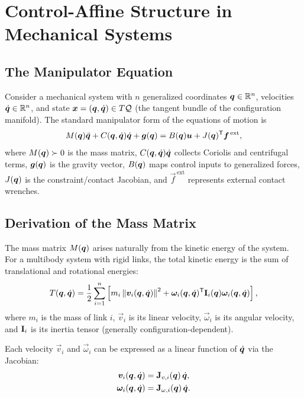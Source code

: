 \section{Control-Affine Structure in Mechanical Systems}

\subsection{The Manipulator Equation}

Consider a mechanical system with $n$ generalized coordinates $\bm{q}\in\mathbb{R}^n$, velocities
$\dot{\bm{q}}\in\mathbb{R}^n$, and state $\bm{x} = (\bm{q}, \dot{\bm{q}}) \in T\mathcal{Q}$ (the tangent bundle of
the configuration manifold). The standard manipulator form of the equations of motion is
\begin{equation}
M(\bm{q})\ddot{\bm{q}} + C(\bm{q},\dot{\bm{q}})\dot{\bm{q}} + \bm{g}(\bm{q}) = B(\bm{q})\bm{u} + J(\bm{q})^{\mathsf{T}}\bm{f}^{\,\text{ext}},
\label{eq:ch3:manipulator}
\end{equation}
where $M(\bm{q})\succ 0$ is the mass matrix, $C(\bm{q},\dot{\bm{q}})\dot{\bm{q}}$ collects Coriolis and
centrifugal terms, $\bm{g}(\bm{q})$ is the gravity vector, $B(\bm{q})$ maps control inputs to
generalized forces, $J(\bm{q})$ is the constraint/contact Jacobian, and
$\vec{f}^{\,\text{ext}}$ represents external contact wrenches.

\subsection{Derivation of the Mass Matrix}

The mass matrix $M(\bm{q})$ arises naturally from the kinetic energy of the system. For a
multibody system with rigid links, the total kinetic energy is the sum of translational
and rotational energies:
\begin{equation}
T(\bm{q},\dot{\bm{q}}) = \frac{1}{2}\sum_{i=1}^n \left[ m_i \left\lVert \bm{v}_i(\bm{q},\dot{\bm{q}}) \right\rVert^2
+ \bm{\omega}_i(\bm{q},\dot{\bm{q}})^{\mathsf{T}} \mathbf{I}_i(\bm{q}) \bm{\omega}_i(\bm{q},\dot{\bm{q}}) \right],
\label{eq:ch3:kinetic-energy}
\end{equation}
where $m_i$ is the mass of link $i$, $\vec{v}_i$ is its linear velocity, $\vec\omega_i$ is its
angular velocity, and $\mathbf{I}_i$ is its inertia tensor (generally configuration-dependent).

Each velocity $\vec{v}_i$ and $\vec\omega_i$ can be expressed as a linear function of
$\dot{\bm{q}}$ via the Jacobian:
\begin{align}
\bm{v}_i(\bm{q},\dot{\bm{q}}) &= \mathbf{J}_{v,i}(\bm{q})\,\dot{\bm{q}}, \\
\bm{\omega}_i(\bm{q},\dot{\bm{q}}) &= \mathbf{J}_{\omega,i}(\bm{q})\,\dot{\bm{q}}.
\end{align}


